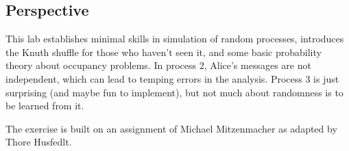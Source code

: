 \documentclass{tufte-handout}
\begin{document}
\pagebreak

\subsection{Perspective}
This lab establishes minimal skills in simulation of random processes, introduces the Knuth shuffle for those who haven’t seen it, and some basic probability theory about occupancy problems. In process 2, Alice’s messages are not independent, which can lead to temping errors in the analysis. Process 3 is just surprising (and maybe fun to implement), but not much about randomness is to be learned from it.

The exercise is built on an assignment of Michael Mitzenmacher as adapted by Thore Husfedlt.
\end{document}
